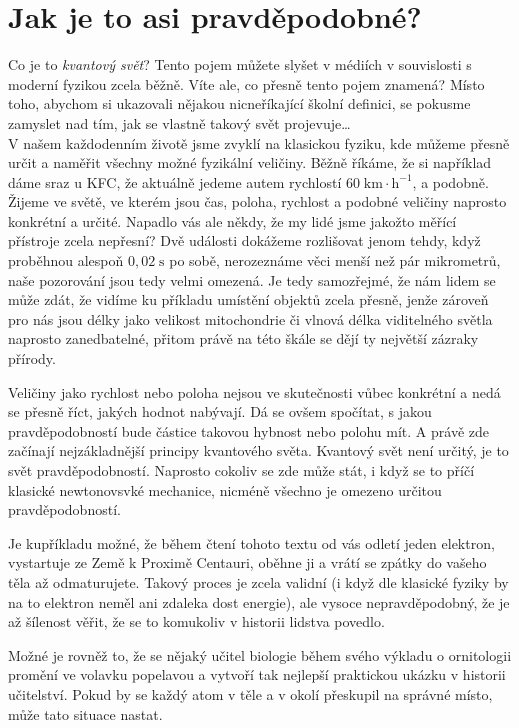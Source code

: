 \documentclass[crop=false]{standalone}
\begin{document}
\section*{Jak je to asi pravděpodobné?}
\quad

Co je to \textit{kvantový svět}? Tento pojem můžete slyšet v médiích v souvislosti s moderní fyzikou zcela běžně. 
Víte ale, co přesně tento pojem znamená? Místo toho, abychom si ukazovali nějakou nicneříkající školní definici, 
se pokusme zamyslet nad tím, jak se vlastně takový svět projevuje\dots
\\

V našem každodenním životě jsme zvyklí na klasickou fyziku, kde můžeme přesně určit a naměřit všechny možné fyzikální veličiny. 
Běžně říkáme, že si například dáme sraz u KFC, že aktuálně jedeme autem rychlostí $60\;\mathrm{km\cdot h^{-1}}$, a podobně. 
Žijeme ve světě, ve kterém jsou čas, poloha, rychlost a podobné veličiny naprosto konkrétní a určité. Napadlo vás ale někdy, 
že my lidé jsme jakožto měřící přístroje zcela nepřesní? Dvě události dokážeme rozlišovat jenom tehdy, když proběhnou alespoň 
$0,02\;\mathrm{s}$ po sobě, nerozeznáme věci menší než pár mikrometrů, naše pozorování jsou tedy velmi omezená. Je tedy samozřejmé, 
že nám lidem se může zdát, že vidíme ku příkladu umístění objektů zcela přesně, jenže zároveň pro nás jsou délky jako velikost 
mitochondrie či vlnová délka viditelného světla naprosto zanedbatelné, přitom právě na této škále se dějí ty největší zázraky přírody.

Veličiny jako rychlost nebo poloha nejsou ve skutečnosti vůbec konkrétní a nedá se přesně říct, jakých hodnot nabývají. Dá se ovšem spočítat, s jakou 
pravděpodobností bude částice takovou hybnost nebo polohu mít. A právě zde začínají nejzákladnější principy kvantového světa. 
Kvantový svět není určitý, je to svět pravděpodobností. Naprosto cokoliv se zde může stát, i když se to příčí klasické newtonovsvké 
mechanice, nicméně všechno je omezeno určitou pravděpodobností.

Je kupříkladu možné, že během čtení tohoto textu od vás odletí jeden elektron, vystartuje ze Země k Proximě Centauri, oběhne ji a 
vrátí se zpátky do vašeho těla až odmaturujete. Takový proces je zcela validní (i když dle klasické fyziky by na to elektron neměl ani 
zdaleka dost energie), ale vysoce nepravděpodobný, že je až šílenost věřit, že se to komukoliv v historii lidstva povedlo.

Možné je rovněž to, že se nějaký učitel biologie během svého výkladu o ornitologii promění ve volavku popelavou a vytvoří tak 
nejlepší praktickou ukázku v historii učitelství. Pokud by se každý atom v těle a v okolí přeskupil na správné místo, může tato situace nastat.
\\
\end{document}
